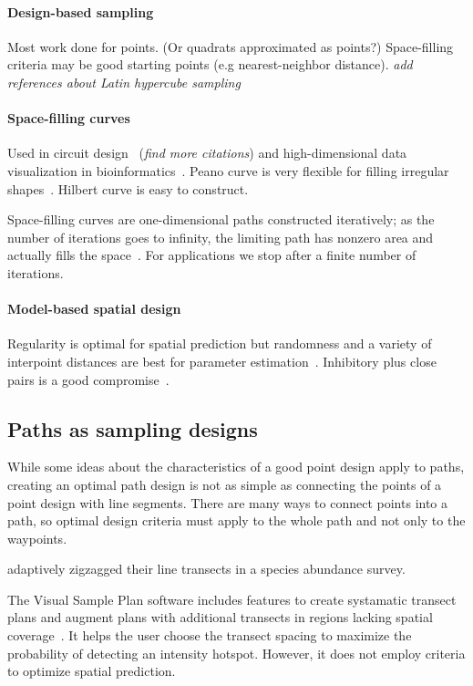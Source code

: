 \documentclass[review]{elsarticle}
\begin{document}
\paragraph{Design-based sampling}
Most work done for points. (Or quadrats approximated as points?) Space-filling
criteria may be good starting points (e.g nearest-neighbor distance).
{\it add references about Latin hypercube sampling}

\paragraph{Space-filling curves}
Used in circuit design~\citep{fanetal} ({\it find more citations}) and
high-dimensional data visualization in bioinformatics~\citep{hilbertvis}.
Peano curve is very flexible for filling irregular shapes~\citep{fanetal}.
Hilbert curve is easy to construct.

Space-filling curves are one-dimensional paths constructed iteratively; as the
number of iterations goes to infinity, the limiting path has nonzero area and
actually fills the space~\citep{sagan}. For applications we stop after a finite
number of iterations.


\paragraph{Model-based spatial design}
Regularity is optimal for spatial prediction but randomness and a variety of
interpoint distances are best for parameter estimation~\citep{diggle}.
Inhibitory plus close pairs is a good compromise~\citep{chipetaetal2017}.


\subsection{Paths as sampling designs}

While some ideas about the characteristics of a good point design apply to
paths, creating an optimal path design is not as simple as connecting the
points of a point design with line segments. There are many ways to connect
points into a path, so optimal design criteria must apply to the whole path and
not only to the waypoints.

\citet{pollard} adaptively zigzagged their line transects in a species
abundance survey.

The Visual Sample Plan software includes features to create systamatic transect
plans and augment plans with additional transects in regions lacking spatial
coverage~\citep{vspguide}. It helps the user choose the transect spacing to
maximize the probability of detecting an intensity hotspot. However, it does
not employ criteria to optimize spatial prediction.
\end{document}
